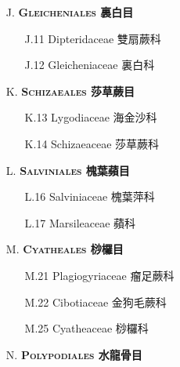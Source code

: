 \begin{enumerate}
\begin{enumerate}
    \end{enumerate}
  \item[J. ] \textbf{\textsc{Gleicheniales} 裏白目}   
    \begin{enumerate}
      \item[J.11] Dipteridaceae 雙扇蕨科      
        
      \item[J.12] Gleicheniaceae 裏白科      
        
    \end{enumerate}
  \item[K. ] \textbf{\textsc{Schizaeales} 莎草蕨目}   
    \begin{enumerate}
      \item[K.13] Lygodiaceae 海金沙科      
        
      \item[K.14] Schizaeaceae 莎草蕨科      
        
    \end{enumerate}
  \item[L. ] \textbf{\textsc{Salviniales} 槐葉蘋目}   
    \begin{enumerate}
      \item[L.16] Salviniaceae 槐葉萍科      
        
      \item[L.17] Marsileaceae 蘋科      
        
    \end{enumerate}
  \item[M. ] \textbf{\textsc{Cyatheales} 桫欏目}   
    \begin{enumerate}
      \item[M.21] Plagiogyriaceae 瘤足蕨科      
        
      \item[M.22] Cibotiaceae 金狗毛蕨科      
        
      \item[M.25] Cyatheaceae 桫欏科      
        
    \end{enumerate}
  \item[N. ] \textbf{\textsc{Polypodiales} 水龍骨目}   

\end{enumerate}
